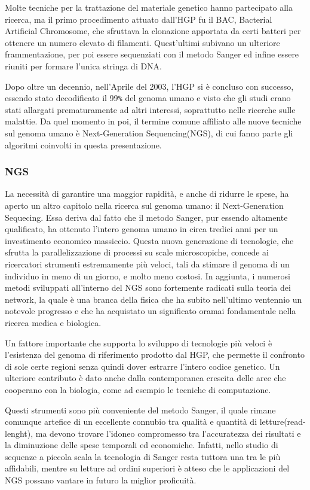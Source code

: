 Molte tecniche per la trattazione del materiale genetico hanno partecipato alla ricerca, ma il primo procedimento attuato dall'HGP fu il BAC, Bacterial Artificial Chromosome, che sfruttava la clonazione apportata da certi batteri per ottenere un numero elevato di filamenti.
Quest'ultimi subivano un ulteriore frammentazione, per poi essere sequenziati con il metodo Sanger ed infine essere riuniti per formare l'unica stringa di DNA.

Dopo oltre un decennio, nell'Aprile del 2003, l'HGP si è concluso con successo, essendo stato decodificato il 99\verb!%! del genoma umano e visto che gli studi erano stati allargati prematuramente ad altri interessi, soprattutto nelle ricerche sulle malattie.
Da quel momento in poi, il termine comune affiliato alle nuove tecniche sul genoma umano è Next-Generation Sequencing(NGS), di cui fanno parte gli algoritmi coinvolti in questa presentazione.

\subsubsection{NGS}
La necessità di garantire una maggior rapidità, e anche di ridurre le spese, ha aperto un altro capitolo nella ricerca sul genoma umano: il Next-Generation Sequecing.
Essa deriva dal fatto che il metodo Sanger, pur essendo altamente qualificato, ha ottenuto l'intero genoma umano in circa tredici anni per un investimento economico massiccio. 
Questa nuova generazione di tecnologie, che sfrutta la parallelizzazione di processi su scale microscopiche, concede ai ricercatori strumenti estremamente più veloci, tali da stimare il genoma di un individuo in meno di un giorno, e molto meno costosi.
In aggiunta, i numerosi metodi sviluppati all'interno del NGS sono fortemente radicati sulla teoria dei network, la quale è una branca della fisica che ha subito nell'ultimo ventennio un notevole progresso e che ha acquistato un significato oramai fondamentale nella ricerca medica e biologica. 

Un fattore importante che supporta lo sviluppo di tecnologie più veloci è l'esistenza del genoma di riferimento prodotto dal HGP, che permette il confronto di sole certe regioni senza quindi dover estrarre l'intero codice genetico.
Un ulteriore contributo è dato anche dalla contemporanea crescita delle aree che cooperano con la biologia, come ad esempio le tecniche di computazione.

Questi strumenti sono più conveniente del metodo Sanger, il quale rimane comunque artefice di un eccellente connubio tra qualità e quantità di letture(read-lenght), ma devono trovare l'idoneo compromesso tra l'accuratezza dei risultati e la diminuzione delle spese temporali ed economiche.
Infatti, nello studio di sequenze a piccola scala la tecnologia di Sanger resta tuttora una tra le più affidabili, mentre su letture ad ordini superiori è atteso che le applicazioni del NGS possano vantare in futuro la miglior proficuità.

